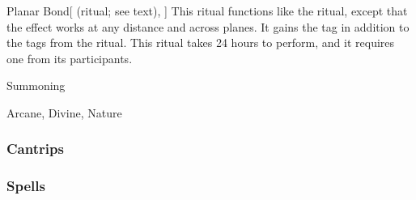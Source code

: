 \lowercase{\hypertarget{spell:Planar Bond}{}}\label{spell:Planar Bond}
\begin{attuneability}[Rank 8]{\hypertarget{spell:Planar Bond}{Planar Bond}}[ (ritual; see text), ]
This ritual functions like the  ritual, except that the effect works at any distance and across planes.
It gains the  tag in addition to the tags from the  ritual.
This ritual takes 24 hours to perform, and it requires one  from its participants.
\end{attuneability}
\vspace{0.25em}


\newpage
\begin{spellsection}{Summoning}

\begin{spellheader}
\end{spellheader}


 Arcane, Divine, Nature

\subsubsection{Cantrips}


\end{spellsection}


\subsubsection{Spells}


